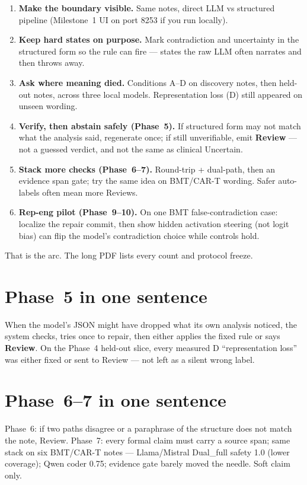 \documentclass[11pt,a4paper]{article}
\begin{document}
\begin{enumerate}
  \item \textbf{Make the boundary visible.} Same notes, direct LLM vs structured pipeline (Milestone~1 UI on port 8253 if you run locally).
  \item \textbf{Keep hard states on purpose.} Mark contradiction and uncertainty in the structured form so the rule can fire --- states the raw LLM often narrates and then throws away.
  \item \textbf{Ask where meaning died.} Conditions A--D on discovery notes, then held-out notes, across three local models. Representation loss (D) still appeared on unseen wording.
  \item \textbf{Verify, then abstain safely (Phase~5).} If structured form may not match what the analysis said, regenerate once; if still unverifiable, emit \textbf{Review} --- not a guessed verdict, and not the same as clinical Uncertain.
  \item \textbf{Stack more checks (Phase~6--7).} Round-trip + dual-path, then an evidence span gate; try the same idea on BMT/CAR-T wording. Safer auto-labels often mean more Reviews.
  \item \textbf{Rep-eng pilot (Phase~9--10).} On one BMT false-contradiction case: localize the repair commit, then show hidden activation steering (not logit bias) can flip the model's contradiction choice while controls hold.
\end{enumerate}

That is the arc. The long PDF lists every count and protocol freeze.

\section{Phase~5 in one sentence}

When the model's JSON might have dropped what its own analysis noticed, the system checks, tries once to repair, then either applies the fixed rule or says \textbf{Review}.
On the Phase~4 held-out slice, every measured D ``representation loss'' was either fixed or sent to Review --- not left as a silent wrong label.

\section{Phase~6--7 in one sentence}

Phase~6: if two paths disagree or a paraphrase of the structure does not match the note, Review.
Phase~7: every formal claim must carry a source span; same stack on six BMT/CAR-T notes --- Llama/Mistral Dual\_full safety 1.0 (lower coverage); Qwen coder 0.75; evidence gate barely moved the needle. Soft claim only.
\end{document}
